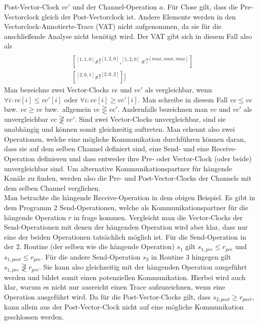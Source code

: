 Post-Vector-Clock $vc'$ und der Channel-Operation $a$. Für Close gilt, 
dass die Pre-Vectorclock gleich der Post-Vectorclock ist. Andere Elemente 
werden in den Vectorclock-Annotierte-Trace (VAT) nicht aufgenommen, da sie 
für die anschließende Analyse nicht benötigt wird.
Der 
VAT gibt sich in diesem Fall also als
\begin{align*}
  [&[^{[2,0,0]}x?^{[3,0,2]}, ^{[3,0,2]}x?^{[4,2,2]}]\\
  &[^{[1, 1, 0]}x!^{[1, 2, 0]}, ^{[1, 2, 0]}x?^{[max, max, max]}]\\
  &[^{[2, 0, 1]}x!^{[2, 0, 2]}]]
\end{align*}
Man bezeichne zwei Vector-Clocks $vc$ und $vc'$ als vergleichbar, wenn
$\forall i: vc[i] \leq vc'[i]$ oder $\forall i: vc[i] \geq vc'[i]$. Man 
schreibe in diesem Fall $vc \leq vc$ bzw. $vc \geq vc$ bzw.~allgemein 
$vc \gtreqless vc'$. Andernfalls 
bezeichnen man $vc$ und $vc'$ als unvergleichbar $vc \not\gtreqless vc'$. 
Sind zwei Vector-Clocks 
unvergleichbar, sind sie unabhängig und können somit gleichzeitig auftreten. 
Man erkennt also zwei Operationen, welche eine mögliche Kommunikation durchführen 
können daran, dass sie auf dem selben Channel definiert sind, eine Send-
und eine Receive-Operation definieren und dass 
entweder ihre Pre- oder Vector-Clock (oder beide) unvergleichbar sind.
Um alternative Kommunikationspartner für hängende Kanäle zu finden, werden also
die Pre- und Post-Vector-Clocks der Channels mit dem selben Channel verglichen.\\
Man betrachte die hängende Receive-Operation in dem obigen Beispiel. Es gibt 
in dem Programm 2 Send-Operationen, welche als Kommunikationspartner für 
die hängende Operation $r$ in frage kommen. Vergleicht man die Vector-Clocks der 
Send-Operationen mit denen der hängenden Operation wird aber klar, dass nur 
eine der beiden Operationen tatsächlich möglich ist. Für die Send-Operation 
in der 2. Routine (der selben wie die hängende Operation) $s_1$ gilt 
$s_{1, pre} \leq r_{pre}$ und $s_{1, post} \leq r_{pre}$.  
Für die andere Send-Operation $s_2$ in Routine 3 hingegen gilt 
$s_{1, pre} \not\gtreqless r_{pre}$. Sie kann also gleichzeitig mit der 
hängenden Operation ausgeführt werden und bildet somit einen potenziellen 
Kommunikation. Hierbei wird auch klar, warum es nicht nur ausreicht einen 
Trace aufzuzeichnen, wenn eine Operation ausgeführt wird. Da für die 
Post-Vector-Clocks gilt, dass $s_{2, post} \geq r_{post}$, kann allein aus der 
Post-Vector-Clock nicht auf eine mögliche Kommunikation geschlossen werden.

